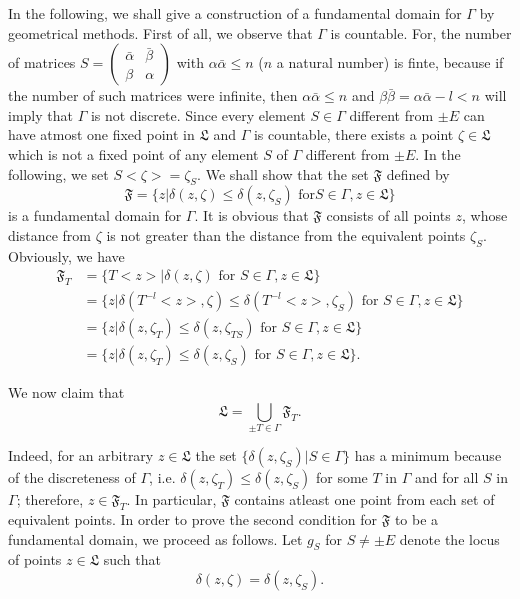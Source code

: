 In the \pageoriginale following, we shall give a construction of a
fundamental domain for $\Gamma$ by geometrical methods. First of all,
we observe that $\Gamma$ is countable. For, the number of matrices $S
= \left(\begin{smallmatrix}
\bar{\alpha} & \bar{\beta}\\
\beta & \alpha \end{smallmatrix} \right)$ with $\alpha \bar{\alpha} \leq
n $ ($n$ a natural number) is finte, because if the number of such
matrices were infinite, then $\alpha\bar{\alpha}\leq n$ and $\beta
\bar{\beta}=\alpha\bar{\alpha}-l<n$ will imply that $\Gamma$ is not
discrete. Since every element $S\in \Gamma$ different from
$\pm E$ can have atmost one fixed point in $\mathfrak{L}$ and $\Gamma$
is countable, there exists a point $\zeta \in \mathfrak{L}$
which is not a fixed point of any element $S$ of $\Gamma$ different
from $\pm E$. In the following, we set $S<\zeta> = \zeta_S$. We shall
show that the set $\mathfrak{F}$ defined by
\begin{equation*}
\mathfrak{F} = \{z|\delta(z,\zeta) \leq \delta (z,\zeta_S) \text{ for
} S \in \Gamma, z\in \mathfrak{L}\} \tag{1}\label{eq3:1}
\end{equation*}
is a fundamental domain for $\Gamma$. It is obvious that
$\mathfrak{F}$ consists of all points $z$, whose distance from $\zeta$
is not greater than the distance from the equivalent points
$\zeta_S$. Obviously, we have 
\begin{align*}
\mathfrak{F}_T & = \{T<z>|\delta (z,\zeta) \text{ for } S \in \Gamma,
z\in \mathfrak{L}\}\\
& = \{z|\delta (T^{-l}<z>,\zeta) \leq \delta(T^{-l} <z>, \zeta_S)
\text{ for }
S \in \Gamma, z \in \mathfrak{L}\}\\
& = \{z|\delta(z,\zeta_T) \leq \delta (z,\zeta_{TS}) \text{ for } S \in
\Gamma, z \in \mathfrak{L}\}\\
& = \{z|\delta (z,\zeta_T) \leq \delta (z,\zeta_S) \text{ for } S \in
\Gamma, z \in \mathfrak{L}\}.
\end{align*}

We now claim that 
$$
\mathfrak{L} = \bigcup\limits_{\pm T \in \Gamma} \mathfrak{F}_T.
$$

Indeed, for an arbitrary $z\in \mathfrak{L}$ the set $\{\delta
(z,\zeta_S)|S\in \Gamma\}$ has a minimum because of the
discreteness of $\Gamma$, i.e. $\delta(z,\zeta_T)\leq \delta
(z,\zeta_S)$ for some $T$ in $\Gamma$ and for all $S$ in $\Gamma$;
therefore, $z\in \mathfrak{F}_T$. In particular,
$\mathfrak{F}$ contains atleast \pageoriginale one point from each set
of equivalent points. In order to prove the second condition for
$\mathfrak{F}$ to be a fundamental domain, we proceed as follows. Let
$g_S$ for $S\neq \pm E$ denote the locus of points $z \in
\mathfrak{L}$ such that 
$$
\delta(z,\zeta) = \delta(z,\zeta_S).
$$

